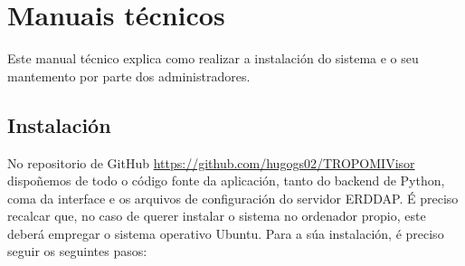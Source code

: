 \chapter{Manuais técnicos}\label{manuais}

Este manual técnico explica como realizar a instalación do sistema e o seu mantemento por parte dos administradores.
\section{Instalación}\label{instalacion}
No repositorio de GitHub \url{https://github.com/hugogs02/TROPOMIVisor} dispoñemos de todo o código fonte da aplicación, tanto do backend de Python, coma da interface e os arquivos de configuración do
servidor ERDDAP. É preciso recalcar que, no caso de querer instalar o sistema no ordenador propio, este deberá empregar o sistema operativo Ubuntu. Para a súa instalación, é preciso seguir os
seguintes pasos:
